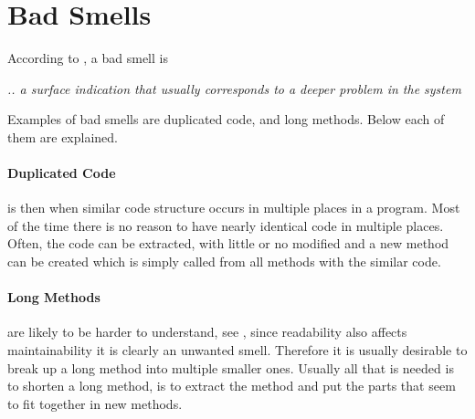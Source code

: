 \section{Bad Smells}
According to \citet{code:smell}, a bad smell is 
\begin{center}
\textit{.. a surface indication that usually corresponds to a deeper problem in the system}
\end{center}

Examples of bad smells are duplicated code, and long methods. Below each of them are explained. 

\paragraph{Duplicated Code} is then when similar code structure occurs in multiple places in a program. Most of the time there is no reason to have nearly identical code in multiple places. Often, the code can be extracted, with little or no modified and a new method can be created which is simply called from all methods with the similar code. 

\paragraph{Long Methods} are likely to be harder to understand, see \citet[p. 64]{fowler:refac}, since readability also affects maintainability it is clearly an unwanted smell. Therefore it is usually desirable to break up a long method into multiple smaller ones. Usually all that is needed is to shorten a long method, is to extract the method and put the parts that seem to fit together in new methods.


